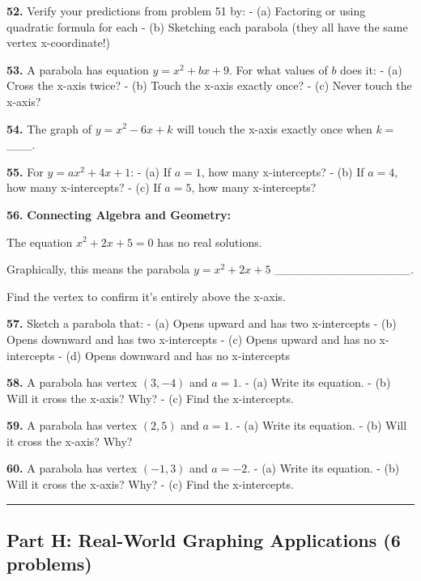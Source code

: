 \documentclass[
  11pt,
]{article}
\begin{document}
\textbf{52.} Verify your predictions from problem 51 by: - (a) Factoring
or using quadratic formula for each - (b) Sketching each parabola (they
all have the same vertex x-coordinate!)

\textbf{53.} A parabola has equation \(y = x^2 + bx + 9\). For what
values of \(b\) does it: - (a) Cross the x-axis twice? - (b) Touch the
x-axis exactly once? - (c) Never touch the x-axis?

\textbf{54.} The graph of \(y = x^2 - 6x + k\) will touch the x-axis
exactly once when \(k ={}\) \_\_\_.

\textbf{55.} For \(y = ax^2 + 4x + 1\): - (a) If \(a = 1\), how many
x-intercepts? - (b) If \(a = 4\), how many x-intercepts? - (c) If
\(a = 5\), how many x-intercepts?

\textbf{56.} \textbf{Connecting Algebra and Geometry:}

The equation \(x^2 + 2x + 5 = 0\) has no real solutions.

Graphically, this means the parabola \(y = x^2 + 2x + 5\)
\_\_\_\_\_\_\_\_\_\_\_\_\_\_\_\_.

Find the vertex to confirm it's entirely above the x-axis.

\textbf{57.} Sketch a parabola that: - (a) Opens upward and has two
x-intercepts - (b) Opens downward and has two x-intercepts - (c) Opens
upward and has no x-intercepts - (d) Opens downward and has no
x-intercepts

\textbf{58.} A parabola has vertex \((3, -4)\) and \(a = 1\). - (a)
Write its equation. - (b) Will it cross the x-axis? Why? - (c) Find the
x-intercepts.

\textbf{59.} A parabola has vertex \((2, 5)\) and \(a = 1\). - (a) Write
its equation. - (b) Will it cross the x-axis? Why?

\textbf{60.} A parabola has vertex \((-1, 3)\) and \(a = -2\). - (a)
Write its equation. - (b) Will it cross the x-axis? Why? - (c) Find the
x-intercepts.

\begin{center}\rule{0.5\linewidth}{0.5pt}\end{center}

\hypertarget{part-h-real-world-graphing-applications-6-problems}{%
\subsection{Part H: Real-World Graphing Applications (6
problems)}\label{part-h-real-world-graphing-applications-6-problems}}
\end{document}
